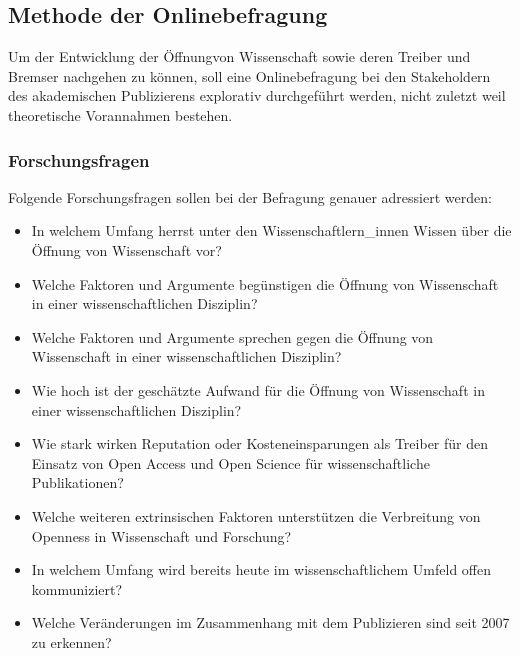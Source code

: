 \subsection{Methode der Onlinebefragung}
Um der Entwicklung der Öffnungvon Wissenschaft sowie deren Treiber und Bremser nachgehen zu können, soll eine Onlinebefragung bei den Stakeholdern des akademischen Publizierens explorativ durchgeführt werden, nicht zuletzt weil theoretische Vorannahmen bestehen.

\subsubsection{Forschungsfragen}
Folgende Forschungsfragen sollen bei der Befragung genauer adressiert werden:
\begin{itemize}
\item In welchem Umfang herrst unter den Wissenschaftlern_innen Wissen über die Öffnung von Wissenschaft vor? 
\item Welche Faktoren und Argumente begünstigen die Öffnung von Wissenschaft in einer wissenschaftlichen Disziplin? 
\item Welche Faktoren und Argumente sprechen gegen die Öffnung von Wissenschaft in einer wissenschaftlichen Disziplin? 
\item Wie hoch ist der geschätzte Aufwand für die Öffnung von Wissenschaft in einer wissenschaftlichen Disziplin? 
\item Wie stark wirken Reputation oder Kosteneinsparungen als Treiber für den Einsatz von Open Access und Open Science für wissenschaftliche Publikationen? 
\item Welche weiteren extrinsischen Faktoren unterstützen die Verbreitung von Openness in Wissenschaft und Forschung? 
\item In welchem Umfang wird bereits heute im wissenschaftlichem Umfeld offen kommuniziert?
\item Welche Veränderungen im Zusammenhang mit dem Publizieren sind seit 2007 zu erkennen?
\end{itemize}